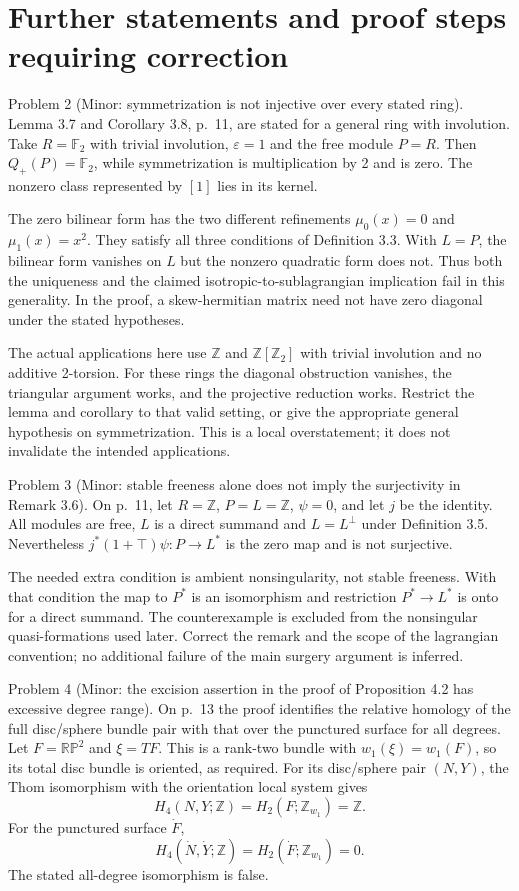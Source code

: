 \documentclass[10pt]{article}
\begin{document}
\section*{Further statements and proof steps requiring correction}
Problem 2 (Minor: symmetrization is not injective over every stated ring).  Lemma 3.7 and Corollary 3.8, p. 11, are stated for a general ring with involution. Take \(R=\mathbb F_2\) with trivial involution, \(\varepsilon=1\) and the free module \(P=R\). Then \(Q_+(P)=\mathbb F_2\), while symmetrization is multiplication by 2 and is zero. The nonzero class represented by \([1]\) lies in its kernel.\par
The zero bilinear form has the two different refinements \(\mu_0(x)=0\) and \(\mu_1(x)=x^2\). They satisfy all three conditions of Definition 3.3. With \(L=P\), the bilinear form vanishes on \(L\) but the nonzero quadratic form does not. Thus both the uniqueness and the claimed isotropic-to-sublagrangian implication fail in this generality. In the proof, a skew-hermitian matrix need not have zero diagonal under the stated hypotheses.\par
The actual applications here use \(\mathbb Z\) and \(\mathbb Z[\mathbb Z_2]\) with trivial involution and no additive 2-torsion. For these rings the diagonal obstruction vanishes, the triangular argument works, and the projective reduction works. Restrict the lemma and corollary to that valid setting, or give the appropriate general hypothesis on symmetrization. This is a local overstatement; it does not invalidate the intended applications.\par
Problem 3 (Minor: stable freeness alone does not imply the surjectivity in Remark 3.6).  On p. 11, let \(R=\mathbb Z\), \(P=L=\mathbb Z\), \(\psi=0\), and let \(j\) be the identity. All modules are free, \(L\) is a direct summand and \(L=L^\perp\) under Definition 3.5. Nevertheless \(j^*(1+\mathord\top)\psi:P\to L^*\) is the zero map and is not surjective.\par
The needed extra condition is ambient nonsingularity, not stable freeness. With that condition the map to \(P^*\) is an isomorphism and restriction \(P^*\to L^*\) is onto for a direct summand. The counterexample is excluded from the nonsingular quasi-formations used later. Correct the remark and the scope of the lagrangian convention; no additional failure of the main surgery argument is inferred.\par
Problem 4 (Minor: the excision assertion in the proof of Proposition 4.2 has excessive degree range).  On p. 13 the proof identifies the relative homology of the full disc/sphere bundle pair with that over the punctured surface for all degrees. Let \(F=\mathbb{RP}^2\) and \(\xi=TF\). This is a rank-two bundle with \(w_1(\xi)=w_1(F)\), so its total disc bundle is oriented, as required. For its disc/sphere pair \((N,Y)\), the Thom isomorphism with the orientation local system gives \[H_4(N,Y;\mathbb Z)=H_2(F;\mathbb Z_{w_1})=\mathbb Z.\] For the punctured surface \(\dot F\), \[H_4(\dot N,\dot Y;\mathbb Z)
   =H_2(\dot F;\mathbb Z_{w_1})=0.\] The stated all-degree isomorphism is false.\par
\end{document}
